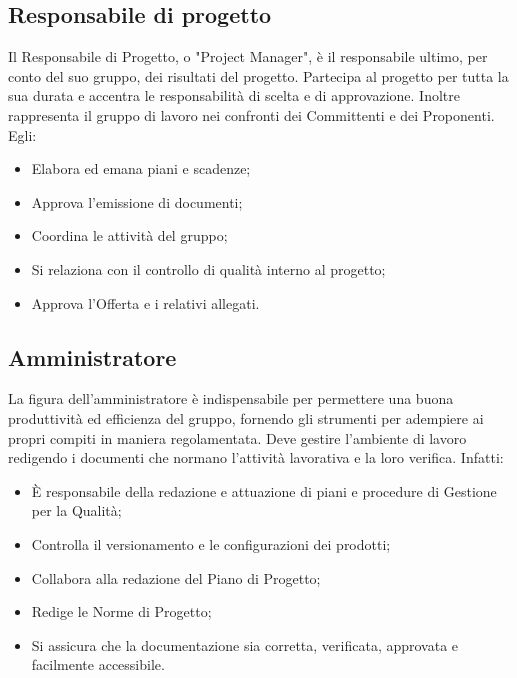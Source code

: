 \documentclass[NormeDiProgetto.tex]{subfiles}
\begin{document}
	\subsection{Responsabile di progetto}
	Il Responsabile di Progetto, o "Project Manager", è il responsabile ultimo, per conto del suo gruppo, dei risultati del progetto. Partecipa al progetto per tutta la sua durata e accentra le responsabilità di scelta e di approvazione. Inoltre rappresenta il gruppo di lavoro nei confronti dei Committenti e dei Proponenti. Egli:
	\begin{itemize}
		\item Elabora ed emana piani e scadenze;
		\item Approva l'emissione di documenti;
		\item Coordina le attività del gruppo;
		\item Si relaziona con il controllo di qualità interno al progetto;
		\item Approva l'Offerta e i relativi allegati.
	\end{itemize}

	\subsection{Amministratore}
	La figura dell'amministratore è indispensabile per permettere una buona produttività ed efficienza del gruppo, fornendo gli strumenti per adempiere ai propri compiti in maniera regolamentata. Deve gestire l'ambiente di lavoro redigendo i documenti che normano l'attività lavorativa e la loro verifica. Infatti:
	\begin{itemize}
		\item È responsabile della redazione e attuazione di piani e procedure di Gestione per la Qualità;
		\item Controlla il versionamento e le configurazioni dei prodotti;
		\item Collabora alla redazione del Piano di Progetto;
		\item Redige le Norme di Progetto;
		\item Si assicura che la documentazione sia corretta, verificata, approvata e facilmente accessibile.
	\end{itemize}
\end{document}

